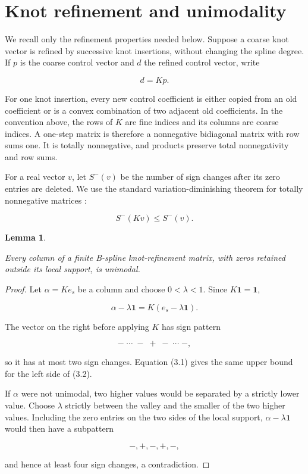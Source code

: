 \documentclass[11pt]{article}
\newtheorem{lemma}[theorem]{Lemma}
\begin{document}
\section{Knot refinement and unimodality}


We recall only the refinement properties needed below. Suppose a coarse knot vector is refined by
successive knot insertions, without changing the spline degree. If $p$ is the coarse control vector
and $d$ the refined control vector, write

\[
d=Kp.
\]

For one knot insertion, every new control coefficient is either copied from an old coefficient or
is a convex combination of two adjacent old coefficients. In the convention above, the rows of
$K$ are fine indices and its columns are coarse indices. A one-step matrix is therefore a
nonnegative bidiagonal matrix with row sums one. It is totally nonnegative, and products preserve
total nonnegativity and row sums.

For a real vector $v$, let $S^-(v)$ be the number of sign changes after its zero entries are deleted.
We use the standard variation-diminishing theorem for totally nonnegative matrices \cite[Chapter~3]{pinkus}:

\[
S^-(Kv)\leq S^-(v).
\tag{3.1}
\]

\Needspace{0.18\textheight}
\begin{lemma}
\label{lem:unimodal-column}

Every column of a finite B-spline knot-refinement matrix, with zeros retained outside its local
support, is unimodal.

\end{lemma}

\begin{proof}

Let $\alpha=Ke_s$ be a column and choose $0<\lambda<1$. Since $K\mathbf 1=\mathbf 1$,

\[
\alpha-\lambda\mathbf 1=K(e_s-\lambda\mathbf 1).
\tag{3.2}
\]

The vector on the right before applying $K$ has sign pattern

\[
-\;\cdots\;-\;+\;-\;\cdots\;-,
\]

so it has at most two sign changes. Equation (3.1) gives the same upper bound for the left side of
(3.2).

If $\alpha$ were not unimodal, two higher values would be separated by a strictly lower value.
Choose $\lambda$ strictly between the valley and the smaller of the two higher values. Including
the zero entries on the two sides of the local support, $\alpha-\lambda\mathbf1$ would then have a
subpattern

\[
-,+,-,+,-,
\]

and hence at least four sign changes, a contradiction.
\end{proof}
\end{document}
